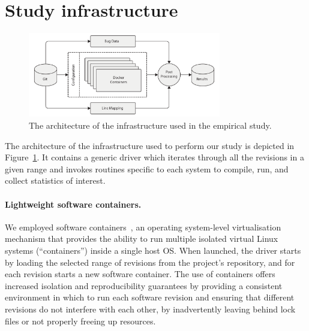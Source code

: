 \section{Study infrastructure}
\label{sec:design}

\begin{figure}[t!]
\centering
\includegraphics[width=0.75\textwidth]{evolution/figures/pipeline}
\caption{The architecture of the infrastructure used in the empirical study.}
\label{fig:arch}
\end{figure}

The architecture of the infrastructure used to perform our study is depicted in
Figure~\ref{fig:arch}. It contains a generic driver which iterates through all
the revisions in a given range and invokes routines specific to each system to
compile, run, and collect statistics of interest.



\paragraph{Lightweight software containers.} We employed software
containers~\cite{containers:eurosys07}, an operating system-level
virtualisation mechanism that provides the ability to run multiple isolated
virtual Linux systems (``containers'') inside a single host OS.  When launched,
the driver starts by loading the selected range of revisions from the project's
\git repository, and for each revision starts a new software container.  The
use of containers offers increased isolation and reproducibility guarantees by
providing a consistent environment in which to run each software revision and
ensuring that different revisions do not interfere with each other, \eg by
inadvertently leaving behind lock files or not properly freeing up resources.

